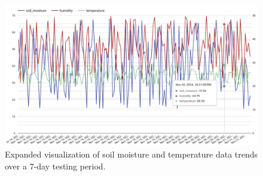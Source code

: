 \documentclass[journal]{Definitions/mdpi}
\begin{document}
\begin{figure}[H]
\includegraphics[width=10.5 cm]{results_image.png}
\caption{Expanded visualization of soil moisture and temperature data trends over a 7-day testing period.}\label{figA1}
\end{figure}
\end{document}
